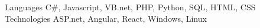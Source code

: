 \begin{cvskills}
  \cvskill
    {Languages}
    {C\#, Javascript, VB.net, PHP, Python, SQL, HTML, CSS}
  \cvskill
    {Technologies}
    {ASP.net, Angular, React, Windows, Linux}
\end{cvskills}
